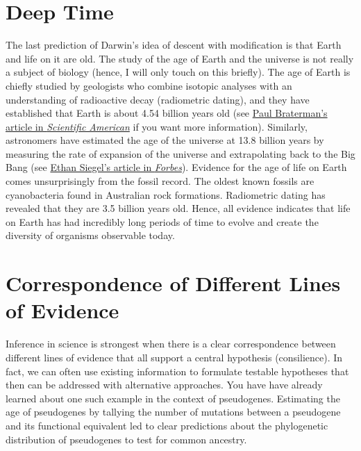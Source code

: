 \documentclass[
]{book}
\begin{document}
\hypertarget{deep-time}{%
\section{Deep Time}\label{deep-time}}

The last prediction of Darwin's idea of descent with modification is that Earth and life on it are old. The study of the age of Earth and the universe is not really a subject of biology (hence, I will only touch on this briefly). The age of Earth is chiefly studied by geologists who combine isotopic analyses with an understanding of radioactive decay (radiometric dating), and they have established that Earth is about 4.54 billion years old (see \href{https://www.scientificamerican.com/article/how-science-figured-out-the-age-of-the-earth/}{Paul Braterman's article in \emph{Scientific American}} if you want more information). Similarly, astronomers have estimated the age of the universe at 13.8 billion years by measuring the rate of expansion of the universe and extrapolating back to the Big Bang (see \href{https://www.forbes.com/sites/startswithabang/2019/12/10/this-is-how-astronomers-know-the-age-of-the-universe-and-you-can-too/?sh=31f9137d16d5}{Ethan Siegel's article in \emph{Forbes}}). Evidence for the age of life on Earth comes unsurprisingly from the fossil record. The oldest known fossils are cyanobacteria found in Australian rock formations. Radiometric dating has revealed that they are 3.5 billion years old. Hence, all evidence indicates that life on Earth has had incredibly long periods of time to evolve and create the diversity of organisms observable today.

\hypertarget{tiktaalik}{%
\section{Correspondence of Different Lines of Evidence}\label{tiktaalik}}

Inference in science is strongest when there is a clear correspondence between different lines of evidence that all support a central hypothesis (consilience). In fact, we can often use existing information to formulate testable hypotheses that then can be addressed with alternative approaches. You have have already learned about one such example in the context of pseudogenes. Estimating the age of pseudogenes by tallying the number of mutations between a pseudogene and its functional equivalent led to clear predictions about the phylogenetic distribution of pseudogenes to test for common ancestry.
\end{document}
